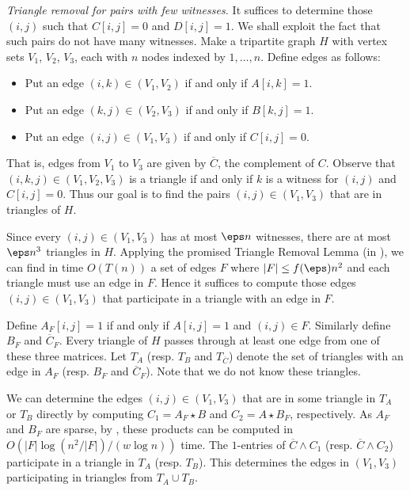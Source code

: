 \smallskip

\noindent
\emph{Triangle removal for pairs with few witnesses.} It suffices to determine those $(i,j)$ such that $C[i,j] = 0$ and $D[i,j] = 1$. We shall exploit the fact that such pairs do not have many witnesses. Make a tripartite graph $H$ with vertex sets $V_1$, $V_2$, $V_3$, each with $n$ nodes indexed by $1,\ldots,n$. Define edges as follows:
\begin{itemize}
\item Put an edge $(i,k) \in (V_1,V_2)$ if and only if $A[i,k]=1$.
\item Put an edge  $(k,j) \in (V_2,V_3)$  if and only if $B[k,j]=1$.
\item Put an edge $(i,j) \in (V_1,V_3)$ if and only if $C[i,j]=0$.\end{itemize}
That is, edges from $V_1$ to $V_3$ are given by $\overline{C}$, the complement of $C$. Observe that
$(i,k,j) \in (V_1,V_2,V_3)$ is a triangle if and only if $k$ is a witness for $(i,j)$ and $C[i,j] = 0$. Thus our goal is to find the pairs $(i,j)\in (V_1,V_3)$ that are in triangles of $H$.

Since every $(i,j) \in (V_1,V_3)$ has at most $\eps n$ witnesses, there are at most $\eps n^3$ triangles in $H$. Applying the promised Triangle Removal Lemma (in ), we can find in time $O(T(n))$ a set of edges $F$ where $|F| \leq f(\eps) n^2$ and each triangle must use an edge in $F$. Hence it suffices to compute those edges $(i,j) \in (V_1,V_3)$ that participate in a triangle with an edge in $F$. 

Define $A_F[i,j]=1$ if and only if $A[i,j]=1$ and $(i,j) \in F$. Similarly define $B_F$ and $\overline{C}_F$. Every triangle of $H$ passes through at least one edge from one of these three matrices. Let $T_A$ (resp. $T_B$ and $T_{\overline{C}}$) denote the set of triangles with an edge in ${A}_F$ (resp. $B_F$ and ${\overline{C}}_F$).  Note that we do not know these triangles.

We can determine the edges $(i,j) \in (V_1,V_3)$ that are in some triangle in $T_A$ or $T_B$ directly by computing $C_1 = {A}_F \star B$ and $C_2 = A \star {B}_F$, respectively. As $A_F$ and $B_F$ are sparse, by , these products can be computed in $O(|F|\log(n^2/|F|)/(w\log n))$ time. The $1$-entries of $\overline{C} \wedge C_1$ (resp. $\overline{C} \wedge C_2$) participate in a triangle in $T_A$ (resp. $T_B$). This determines the edges in $(V_1,V_3)$ participating in triangles from $T_A \cup T_B$.

